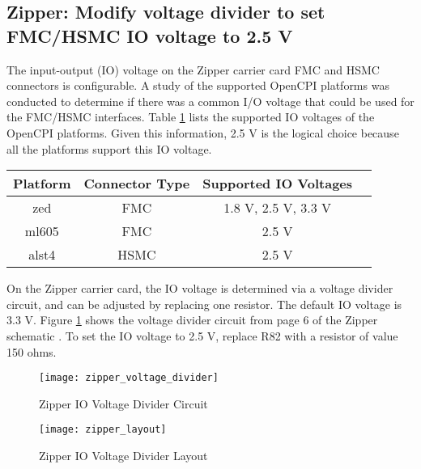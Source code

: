 \subsection*{Zipper: Modify voltage divider to set FMC/HSMC IO voltage to 2.5 V}
The input-output (IO) voltage on the Zipper carrier card FMC and HSMC connectors is configurable. A study of the supported OpenCPI platforms was conducted to determine if there was a common I/O voltage that could be used for the FMC/HSMC interfaces. Table \ref{table:io_voltages} lists the supported IO voltages of the OpenCPI platforms. Given this information, 2.5 V is the logical choice because all the platforms support this IO voltage.\par\smallskip
		\begin{table}[h]
			\begin{center}
				\scriptsize
  				\begin{tabular}{|c|c|c|c|}
    			\hline
    			\rowcolor{blue}
    			Platform & Connector Type & Supported IO Voltages\\
    			\hline
    			zed & FMC & 1.8 V, 2.5 V, 3.3 V\\
    			\hline
    			ml605 & FMC & 2.5 V\\
    			\hline
    			alst4 & HSMC & 2.5 V\\
    			\hline
   				\end{tabular}
				\label{table:io_voltages}
		  	\end{center}
   		\end{table}
\normalsize
\noindent On the Zipper carrier card, the IO voltage is determined via a voltage divider circuit, and can be adjusted by replacing one resistor. The default IO voltage is 3.3 V. Figure \ref{fig:zipper_voltage_divider} shows the voltage divider circuit from page 6 of the Zipper schematic \cite{zipper_sch}. To set the IO voltage to 2.5 V, replace R82 with a resistor of value 150 ohms.\par\smallskip
	\begin{figure}[ht]
		\begin{center}
		\texttt{[image: zipper\_voltage\_divider]}
		\caption{Zipper IO Voltage Divider Circuit}
		\label{fig:zipper_voltage_divider}
		\end{center}
	\end{figure}
	\begin{figure}[ht]
		\begin{center}
		\texttt{[image: zipper\_layout]}
		\caption{Zipper IO Voltage Divider Layout}
		\label{fig:zipper_layout}
		\end{center}
	\end{figure}
\pagebreak


